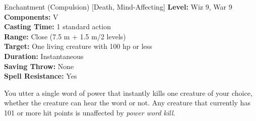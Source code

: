 {Enchantment (Compulsion) [Death, Mind-Affecting]}
{
	\textbf{Level:}
	Wiz 9, War 9\\
	\textbf{Components:}
	V\\
	\textbf{Casting Time:}
	1 standard action\\
	\textbf{Range:}
	Close (7.5 m + 1.5 m/2 levels)\\
	\textbf{Target:}
	One living creature with 100 hp or less\\
	\textbf{Duration:}
	Instantaneous\\
	\textbf{Saving Throw:}
	None\\
	\textbf{Spell Resistance:}
	Yes\\
}
{
	You utter a single word of power that instantly kills one creature of your choice, whether the creature can hear the word or not. Any creature that currently has 101 or more hit points is unaffected by \emph{power word kill}.

}
